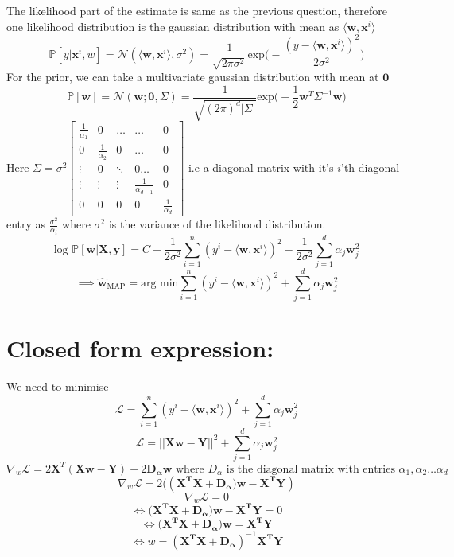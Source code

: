 \documentclass[a4paper,11pt]{article}
\begin{document}
\begin{mlsolution}
The likelihood part of the estimate is same as the previous question, therefore one likelihood distribution is  the gaussian distribution with mean as $\langle \mathbf{w,x}^i \rangle$ \[
\mathbb{P}[y|\mathbf{x}^i,w] = \mathcal{N}(\langle \mathbf{w,x}^i \rangle,\sigma^2) = \frac{1}{\sqrt{2\pi\sigma^2}} \text{exp}\bigg(-\frac{(y-\langle \mathbf{w,x}^i \rangle)^2}{2\sigma^2}\bigg)
\]
For the prior, we can take a multivariate gaussian distribution with mean at $\mathbf{0}$\[
\mathbb{P}[\mathbf{w}] = \mathcal{N}(\mathbf{w};\mathbf{0},\Sigma) = \frac{1}{\sqrt{(2\pi)^d |\Sigma|}} \text{exp}\bigg(-\frac{1}{2}\mathbf{w}^T\Sigma^{-1}\mathbf{w}\bigg)
\]
Here $\Sigma = \sigma^2
\begin{bmatrix} 
\frac{1}{\alpha_1} & 0 & \dots & \dots & 0
\\ 0 & \frac{1}{\alpha_2} & 0 & \dots & 0
\\ \vdots & 0 & \ddots & 0\dots & 0
\\ \vdots & \vdots & \vdots & \frac{1}{\alpha_{d-1}} & 0
\\ 0 & 0 & 0 & 0 & \frac{1}{\alpha_d}
\end{bmatrix}$ i.e a diagonal matrix with it's $i$'th diagonal entry as $\frac{\sigma^2}{\alpha_i}$ where $\sigma^2$ is the variance of the likelihood distribution.\[
\text{log }\mathbb{P}[\mathbf{w|X,y}] = C -\frac{1}{2\sigma^2}\sum_{i=1}^{n}(y^i-\langle \mathbf{w,x}^i \rangle)^2 -\frac{1}{2\sigma^2}\sum_{j=1}^{d} \alpha_j \mathbf{w}_j^2 \]
\[ \implies \mathbf{\hat{w}}_{\text{MAP}} = \text{arg min} \sum_{i=1}^{n}(y^i-\langle \mathbf{w,x}^i \rangle)^2 + \sum_{j=1}^{d} \alpha_j \mathbf{w}_j^2   \]

\section*{Closed form expression:}
We need to minimise \[ \mathcal{L} =  \sum_{i=1}^{n}(y^i-\langle \mathbf{w,x}^i \rangle)^2 + \sum_{j=1}^{d} \alpha_j \mathbf{w}_j^2   \]
 \[ \mathcal{L} =  ||\mathbf{Xw - Y}||^2 + \sum_{j=1}^{d} \alpha_j \mathbf{w}_j^2   \]
 \[ \nabla_w \mathcal{L} = 2\mathbf{X}^T(\mathbf{Xw - Y}) + 2\mathbf{D_{\alpha}w} \text{ where } D_{\alpha} \text{ is the diagonal matrix with entries } \alpha_1,\alpha_2 \dots \alpha_d \]
 \[ \nabla_w \mathcal{L} = 2((\mathbf{X^T X + D_{\alpha})w} -\mathbf{X^T Y})\]
 \[\nabla_w \mathcal{L}= 0  \]
 \[ \iff (\mathbf{X^T X + D_{\alpha})w} -\mathbf{X^T Y} = 0 \]
 \[ \iff (\mathbf{X^T X + D_{\alpha})w}  = \mathbf{X^T Y} \]
 \[ \iff w = \mathbf{(X^T X + D_{\alpha})^{-1} X^T Y} \]
\end{mlsolution}
\end{document}
